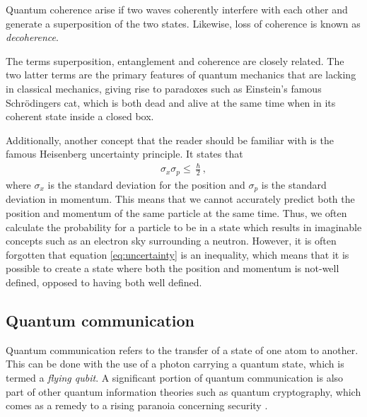 Quantum coherence arise if two waves coherently interfere with each other and generate a superposition of the two states. Likewise, loss of coherence is known as \textit{decoherence}.

The terms superposition, entanglement and coherence are closely related. The two latter terms are the primary features of quantum mechanics that are lacking in classical mechanics, giving rise to paradoxes such as Einstein's famous Schrödingers cat, which is both dead and alive at the same time when in its coherent state inside a closed box.

Additionally, another concept that the reader should be familiar with is the famous Heisenberg uncertainty principle. It states that
\begin{align}
    \sigma_x \sigma_p \leq \frac{\hslash}{2},
    \label{eq:uncertainty}
\end{align}
where $\sigma_x$ is the standard deviation for the position and $\sigma_p$ is the standard deviation in momentum. This means that we cannot accurately predict both the position and momentum of the same particle at the same time. Thus, we often calculate the probability for a particle to be in a state which results in imaginable concepts such as an electron sky surrounding a neutron. However, it is often forgotten that equation \ref{eq:uncertainty} is an inequality, which means that it is possible to create a state where both the position and momentum is not-well defined, opposed to having both well defined.

\subsection{Quantum communication}

Quantum communication refers to the transfer of a state of one atom to another. This can be done with the use of a photon carrying a quantum state, which is termed a \textit{flying qubit}. A significant portion of quantum communication is also part of other quantum information theories such as quantum cryptography, which comes as a remedy to a rising paranoia concerning security \cite{Griffiths2002, Pavicic2006}.


